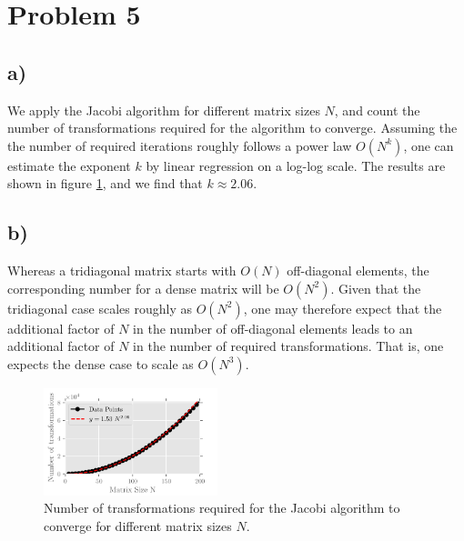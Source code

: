 \documentclass[english,notitlepage,reprint,nofootinbib]{revtex4-2}  %
\begin{document}
\section{Problem 5}
\subsection*{a)}
We apply the Jacobi algorithm for different matrix sizes \(N\), and count the number of transformations required for the algorithm to converge.
Assuming the the number of required iterations roughly follows a power law \(O(N^k)\), one can estimate the exponent \(k\) by linear regression on a log-log scale.
The results are shown in figure \ref{fig:iterations}, and we find that \(k\approx 2.06\).
\newline
\newline
\subsection*{b)}
Whereas a tridiagonal matrix starts with \(O(N)\) off-diagonal elements, the corresponding number for a dense matrix will be \(O(N^2)\).
Given that the tridiagonal case scales roughly as \(O(N^2)\), one may therefore expect that the additional factor of \(N\) in the number of off-diagonal elements leads to an additional factor of \(N\) in the number of required transformations.
That is, one expects the dense case to scale as \(O(N^3)\).

\begin{figure}
    \centering
    \includegraphics[width=0.45\textwidth]{Code/output/iterations.pdf}
    \caption{Number of transformations required for the Jacobi algorithm to converge for different matrix sizes \(N\).}
    \label{fig:iterations}
\end{figure}
\end{document}
